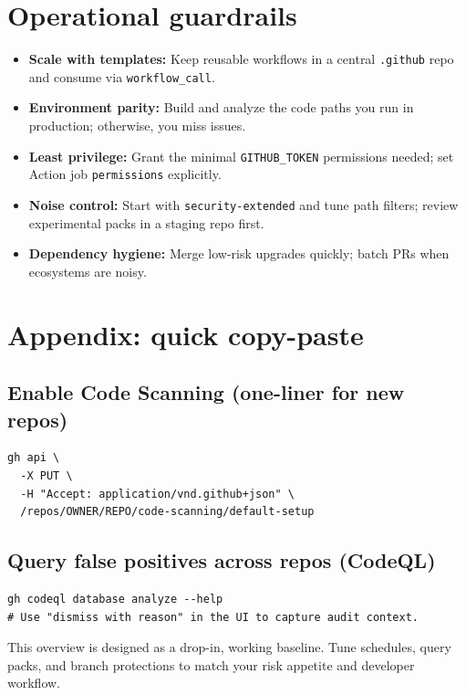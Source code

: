 \documentclass[11pt]{article}
\begin{document}
\section{Operational guardrails}
\begin{itemize}
  \item \textbf{Scale with templates:} Keep reusable workflows in a central \texttt{.github} repo and consume via \texttt{workflow\_call}.
  \item \textbf{Environment parity:} Build and analyze the code paths you run in production; otherwise, you miss issues.
  \item \textbf{Least privilege:} Grant the minimal \texttt{GITHUB\_TOKEN} permissions needed; set Action job \texttt{permissions} explicitly.
  \item \textbf{Noise control:} Start with \texttt{security-extended} and tune path filters; review experimental packs in a staging repo first.
  \item \textbf{Dependency hygiene:} Merge low-risk upgrades quickly; batch PRs when ecosystems are noisy.
\end{itemize}

\section{Appendix: quick copy-paste}
\subsection*{Enable Code Scanning (one-liner for new repos)}
\begin{verbatim}
gh api \
  -X PUT \
  -H "Accept: application/vnd.github+json" \
  /repos/OWNER/REPO/code-scanning/default-setup
\end{verbatim}

\subsection*{Query false positives across repos (CodeQL)}
\begin{verbatim}
gh codeql database analyze --help
# Use "dismiss with reason" in the UI to capture audit context.
\end{verbatim}

\vfill
\begin{center}
\small
This overview is designed as a drop-in, working baseline. Tune schedules, query packs, and branch protections to match your risk appetite and developer workflow.
\end{center}
\end{document}
